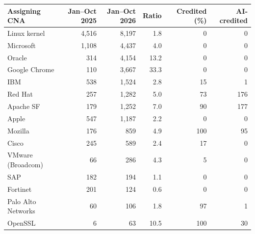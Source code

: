 \begin{tabular}{lrrrrr}
\toprule
Assigning CNA & Jan--Oct 2025 & Jan--Oct 2026 & Ratio & Credited (\%) & AI-credited \\
\midrule
Linux kernel & 4,516 & 8,197 & 1.8 & 0 & 0 \\
Microsoft & 1,108 & 4,437 & 4.0 & 0 & 0 \\
Oracle & 314 & 4,154 & 13.2 & 0 & 0 \\
Google Chrome & 110 & 3,667 & 33.3 & 0 & 0 \\
IBM & 538 & 1,524 & 2.8 & 15 & 1 \\
Red Hat & 257 & 1,282 & 5.0 & 73 & 176 \\
Apache SF & 179 & 1,252 & 7.0 & 90 & 177 \\
Apple & 547 & 1,187 & 2.2 & 0 & 0 \\
Mozilla & 176 & 859 & 4.9 & 100 & 95 \\
Cisco & 245 & 589 & 2.4 & 17 & 0 \\
VMware (Broadcom) & 66 & 286 & 4.3 & 5 & 0 \\
SAP & 182 & 194 & 1.1 & 0 & 0 \\
Fortinet & 201 & 124 & 0.6 & 0 & 0 \\
Palo Alto Networks & 60 & 106 & 1.8 & 97 & 1 \\
OpenSSL & 6 & 63 & 10.5 & 100 & 30 \\
\bottomrule
\end{tabular}
